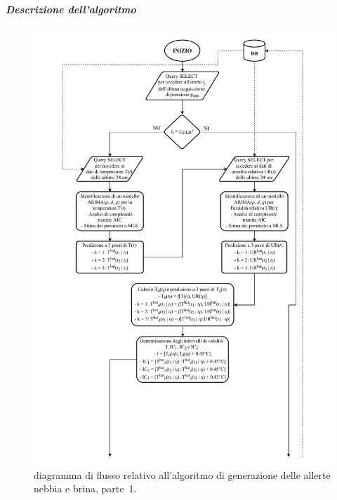 \subparagraph{Descrizione dell'algoritmo}

\begin{figure}[h!]
	\centering
	\includegraphics[width=1\linewidth]{./Iterazione 3/OtherFiles/FC - Generatore allerte F&F(1).pdf}
	\caption{diagramma di flusso relativo all'algoritmo di generazione delle allerte nebbia e brina, parte~1.}
	\label{fig:FFFlowChart_1}
\end{figure}

